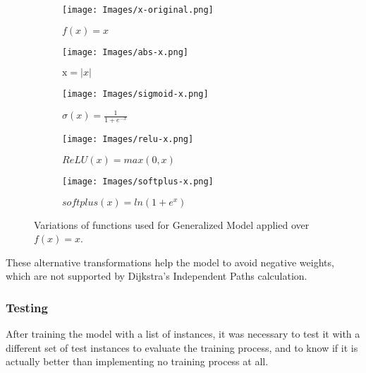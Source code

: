 \begin{figure}[htbp]
    \centering
    \begin{subfigure}[b]{0.3\textwidth}
        \texttt{[image: Images/x-original.png]}
        \caption{$f(x) = x$}
        \label{fig:x-original}
    \end{subfigure}
    \hspace{0.01\textwidth}
    \begin{subfigure}[b]{0.3\textwidth}
        \texttt{[image: Images/abs-x.png]}
        \caption{$\mathrm{x} = |x|$}
        \label{fig:abs-x}
    \end{subfigure}
    \hspace{0.01\textwidth}
    \begin{subfigure}[b]{0.3\textwidth}
        \texttt{[image: Images/sigmoid-x.png]}
        \caption{$\sigma(x) = \frac{1}{1+e^{-x}}$}
        \label{fig:sigmoid-x}
    \end{subfigure}

    \vspace{0.5cm}

    \begin{subfigure}[b]{0.3\textwidth}
        \texttt{[image: Images/relu-x.png]}
        \caption{$ReLU(x) = max(0, x)$}
        \label{fig:relu-x}
    \end{subfigure}
    \hspace{0.01\textwidth}
    \begin{subfigure}[b]{0.3\textwidth}
        \texttt{[image: Images/softplus-x.png]}
        \caption{$softplus(x) = ln(1+e^x)$}
        \label{fig:softplus-x}
    \end{subfigure}
    
    \caption{Variations of functions used for Generalized Model applied over $f(x) = x$.}
    \label{fig:GLM}
\end{figure}
These alternative transformations help the model to avoid negative weights, which are not supported by Dijkstra's Independent Paths calculation.

\subsubsection{Testing}

After training the model with a list of instances, it was necessary to test it with a different set of test instances to evaluate the training process, and to know if it is actually better than implementing no training process at all. 

